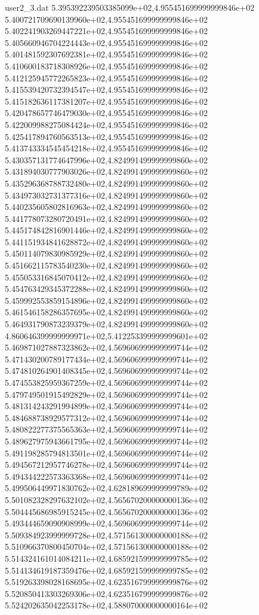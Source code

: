\begin{filecontents}{user2_3.dat}
5.395392239503385099e+02,4.955451699999999846e+02
5.400721709690139960e+02,4.955451699999999846e+02
5.402241903269447221e+02,4.955451699999999846e+02
5.405660946704224443e+02,4.955451699999999846e+02
5.401481592307692381e+02,4.955451699999999846e+02
5.410600183718308926e+02,4.955451699999999846e+02
5.412125945772265823e+02,4.955451699999999846e+02
5.415539420732394547e+02,4.955451699999999846e+02
5.415182636117381207e+02,4.955451699999999846e+02
5.420478657746479030e+02,4.955451699999999846e+02
5.422009988275084424e+02,4.955451699999999846e+02
5.425417894760563513e+02,4.955451699999999846e+02
5.413743334545454218e+02,4.955451699999999846e+02
5.430357131774647996e+02,4.824991499999999860e+02
5.431894030777903026e+02,4.824991499999999860e+02
5.435296368788732480e+02,4.824991499999999860e+02
5.434973032731377316e+02,4.824991499999999860e+02
5.440235605802816963e+02,4.824991499999999860e+02
5.441778073280720491e+02,4.824991499999999860e+02
5.445174842816901446e+02,4.824991499999999860e+02
5.441151934841628872e+02,4.824991499999999860e+02
5.450114079830985929e+02,4.824991499999999860e+02
5.451662115783540230e+02,4.824991499999999860e+02
5.455053316845070412e+02,4.824991499999999860e+02
5.454763429345372288e+02,4.824991499999999860e+02
5.459992553859154896e+02,4.824991499999999860e+02
5.461546158286357695e+02,4.824991499999999860e+02
5.464931790873239379e+02,4.824991499999999860e+02
4.860646399999999971e+02,5.412253399999999601e+02
5.469871027887323862e+02,4.569606999999999744e+02
5.471430200789177434e+02,4.569606999999999744e+02
5.474810264901408345e+02,4.569606999999999744e+02
5.474553825959367259e+02,4.569606999999999744e+02
5.479749501915492829e+02,4.569606999999999744e+02
5.481314243291994899e+02,4.569606999999999744e+02
5.484688738929577312e+02,4.569606999999999744e+02
5.480822277375565363e+02,4.569606999999999744e+02
5.489627975943661795e+02,4.569606999999999744e+02
5.491198285794813501e+02,4.569606999999999744e+02
5.494567212957746278e+02,4.569606999999999744e+02
5.494344222573363368e+02,4.569606999999999744e+02
5.499506449971830762e+02,4.628189699999999789e+02
5.501082328297632102e+02,4.565670200000000136e+02
5.504445686985915245e+02,4.565670200000000136e+02
5.493444659090908999e+02,4.569606999999999744e+02
5.509384923999999728e+02,4.571561300000000188e+02
5.510966370800450704e+02,4.571561300000000188e+02
5.514324161014084211e+02,4.685921599999999785e+02
5.514134619187359476e+02,4.685921599999999785e+02
5.519263398028168695e+02,4.623516799999999876e+02
5.520850413303269306e+02,4.623516799999999876e+02
5.524202635042253178e+02,4.588070000000000164e+02

\end{filecontents}

